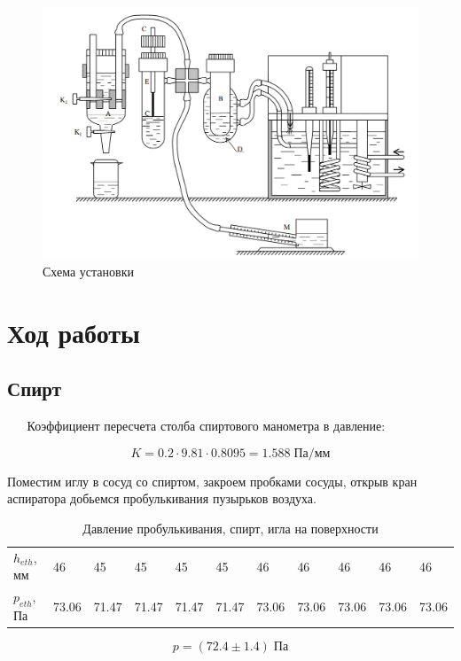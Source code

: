 \documentclass[12pt,a4paper]{article}
\begin{document}
	
	\begin{figure}[h]
		\begin{center}
			\includegraphics[width=0.9\linewidth]{scheme.png}
		\end{center}
		\caption{Схема установки}
		\label{scheme}
	\end{figure}	
	
	
	\section*{Ход работы}
	
	\subsection*{Спирт}
	
		$\quad \;$ Коэффициент пересчета столба спиртового манометра в давление:
		
		$$K = 0.2 \cdot 9.81 \cdot 0.8095 = 1.588 \; \text{Па}/\text{мм}$$
	
		Поместим иглу в сосуд со спиртом, закроем пробками сосуды, открыв кран аспиратора добьемся пробулькивания пузырьков воздуха.
		
		\begin{table}[h]
			\caption{Давление пробулькивания, спирт, игла на поверхности}
			\begin{tabular}{|l|llllllllll|}
				$h_{eth}$, мм & 46    & 45    & 45    & 45    & 45    & 46    & 46    & 46    & 46    & 46        \\
				$p_{eth}$, Па & 73.06 & 71.47 & 71.47 & 71.47 & 71.47 & 73.06 & 73.06 & 73.06 & 73.06 & 73.06
			\end{tabular}
		\end{table}
	
		$$p = (72.4 \pm 1.4) \; \text{Па}$$
		
\end{document}
